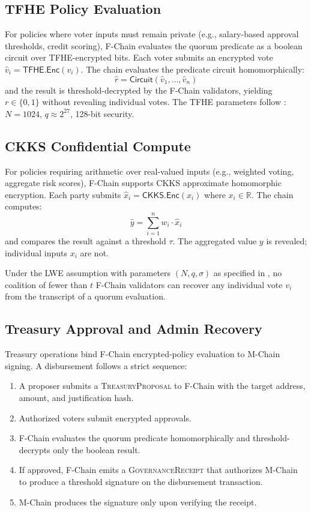 \subsection{TFHE Policy Evaluation}

For policies where voter inputs must remain private (e.g., salary-based approval
thresholds, credit scoring), F-Chain evaluates the quorum predicate as a
boolean circuit over TFHE-encrypted bits. Each voter submits an encrypted vote
$\hat{v}_i = \mathsf{TFHE.Enc}(v_i)$. The chain evaluates the predicate
circuit homomorphically:
\[
    \hat{r} = \mathsf{Circuit}(\hat{v}_1, \ldots, \hat{v}_n)
\]
and the result is threshold-decrypted by the F-Chain validators, yielding
$r \in \{0, 1\}$ without revealing individual votes. The TFHE parameters
follow \cite{lux-tfhe}: $N = 1024$, $q \approx 2^{27}$, 128-bit security.

\subsection{CKKS Confidential Compute}

For policies requiring arithmetic over real-valued inputs (e.g., weighted voting,
aggregate risk scores), F-Chain supports CKKS approximate homomorphic encryption.
Each party submits $\hat{x}_i = \mathsf{CKKS.Enc}(x_i)$ where $x_i \in \mathbb{R}$.
The chain computes:
\[
    \hat{y} = \sum_{i=1}^{n} w_i \cdot \hat{x}_i
\]
and compares the result against a threshold $\tau$. The aggregated value $y$ is
revealed; individual inputs $x_i$ are not.

\begin{proposition}\label{prop:vote-privacy}
Under the LWE assumption with parameters $(N, q, \sigma)$ as specified in
\cite{lux-pq-crypto-suite}, no coalition of fewer than $t$ F-Chain validators
can recover any individual vote $v_i$ from the transcript of a quorum evaluation.
\end{proposition}

\subsection{Treasury Approval and Admin Recovery}

Treasury operations bind F-Chain encrypted-policy evaluation to M-Chain signing.
A disbursement follows a strict sequence:

\begin{enumerate}
    \item A proposer submits a \textsc{TreasuryProposal} to F-Chain with
          the target address, amount, and justification hash.
    \item Authorized voters submit encrypted approvals.
    \item F-Chain evaluates the quorum predicate homomorphically and
          threshold-decrypts only the boolean result.
    \item If approved, F-Chain emits a \textsc{GovernanceReceipt} that
          authorizes M-Chain to produce a threshold signature on the
          disbursement transaction.
    \item M-Chain produces the signature only upon verifying the receipt.
\end{enumerate}


